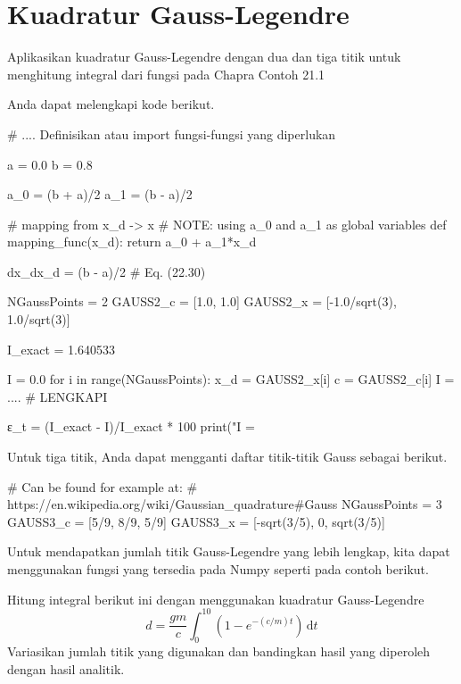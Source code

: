 \section{Kuadratur Gauss-Legendre}

\begin{soal}
Aplikasikan kuadratur Gauss-Legendre dengan dua dan tiga titik untuk
menghitung integral dari fungsi pada Chapra Contoh 21.1
\end{soal}

Anda dapat melengkapi kode berikut.
\begin{pythoncode}
# .... Definisikan atau import fungsi-fungsi yang diperlukan

a = 0.0
b = 0.8

a_0 = (b + a)/2
a_1 = (b - a)/2

# mapping from x_d -> x
# NOTE: using a_0 and a_1 as global variables
def mapping_func(x_d):
    return a_0 + a_1*x_d
    
dx_dx_d = (b - a)/2 # Eq. (22.30)

NGaussPoints = 2
GAUSS2_c = [1.0, 1.0]
GAUSS2_x = [-1.0/sqrt(3), 1.0/sqrt(3)]
    
I_exact = 1.640533
    
I = 0.0
for i in range(NGaussPoints):
    x_d = GAUSS2_x[i]
    c = GAUSS2_c[i]
    I = .... # LENGKAPI
    
ε_t = (I_exact - I)/I_exact * 100
print("I = %
\end{pythoncode}

Untuk tiga titik, Anda dapat mengganti daftar titik-titik Gauss sebagai berikut.
\begin{pythoncode}
# Can be found for example at:
# https://en.wikipedia.org/wiki/Gaussian_quadrature#Gauss%
NGaussPoints = 3
GAUSS3_c = [5/9, 8/9, 5/9]
GAUSS3_x = [-sqrt(3/5), 0, sqrt(3/5)]
\end{pythoncode}

Untuk mendapatkan jumlah titik Gauss-Legendre yang lebih lengkap, kita dapat
menggunakan fungsi yang tersedia pada Numpy seperti pada contoh berikut.

\begin{soal}
Hitung integral berikut ini dengan menggunakan kuadratur Gauss-Legendre
\begin{equation*}
d = \frac{gm}{c} \int_{0}^{10} (1 - e^{-(c/m)t}) \, \mathrm{d}t
\end{equation*}
Variasikan jumlah titik yang digunakan dan
bandingkan hasil yang diperoleh dengan hasil analitik.
\end{soal}

